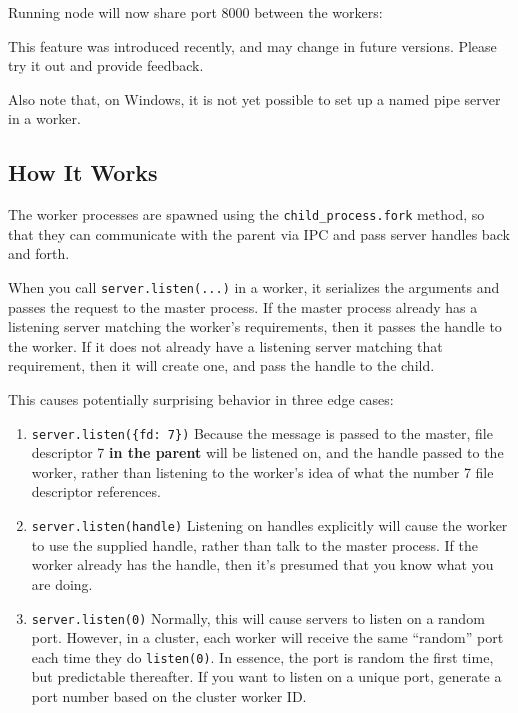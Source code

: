Running node will now share port 8000 between the workers:

\begin{Shaded}
\end{Shaded}

This feature was introduced recently, and may change in future versions.
Please try it out and provide feedback.

Also note that, on Windows, it is not yet possible to set up a named
pipe server in a worker.

\subsection{How It Works}

The worker processes are spawned using the \texttt{child\_process.fork}
method, so that they can communicate with the parent via IPC and pass
server handles back and forth.

When you call \texttt{server.listen(...)} in a worker, it serializes the
arguments and passes the request to the master process. If the master
process already has a listening server matching the worker's
requirements, then it passes the handle to the worker. If it does not
already have a listening server matching that requirement, then it will
create one, and pass the handle to the child.

This causes potentially surprising behavior in three edge cases:

\begin{enumerate}
\item
  \texttt{server.listen(\{fd: 7\})} Because the message is passed to the
  master, file descriptor 7 \textbf{in the parent} will be listened on,
  and the handle passed to the worker, rather than listening to the
  worker's idea of what the number 7 file descriptor references.
\item
  \texttt{server.listen(handle)} Listening on handles explicitly will
  cause the worker to use the supplied handle, rather than talk to the
  master process. If the worker already has the handle, then it's
  presumed that you know what you are doing.
\item
  \texttt{server.listen(0)} Normally, this will cause servers to listen
  on a random port. However, in a cluster, each worker will receive the
  same ``random'' port each time they do \texttt{listen(0)}. In essence,
  the port is random the first time, but predictable thereafter. If you
  want to listen on a unique port, generate a port number based on the
  cluster worker ID.
\end{enumerate}

